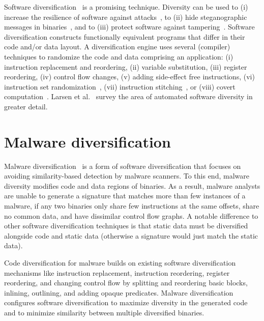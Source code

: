 \documentclass[letterpaper,twocolumn,10pt]{article}
\begin{document}
Software diversification~\cite{cohen93csec, collberg97, forrest97hotos,
cox06usenix, kisserli07cobassa, Lin09DIMVA, franz10npsw, multicompiler, Hiser12SP,
Pappas12SP, Giuffrida12SEC} is a promising technique. Diversity can be
used to (i) increase the resilience of software against
attacks~\cite{cohen93csec, forrest97hotos, geer03cciar, cox06usenix,
kisserli07cobassa, Lin09DIMVA, franz10npsw, multicompiler, Hiser12SP, Pappas12SP,
Giuffrida12SEC}, to (ii) hide steganographic messages in
binaries~\cite{elkhalil04icics}, and to (iii) protect software against
tampering~\cite{collberg12acsac}. Software diversification constructs
functionally equivalent programs that differ in their code and/or data layout. A
diversification engine uses several (compiler) techniques to randomize the code and
data comprising an application: (i) instruction replacement and reordering, (ii)
variable substitution, (iii) register reordering, (iv) control flow changes, (v)
adding side-effect free instructions, (vi) instruction set
randomization~\cite{barrantes05tiss, kc03ccs, sovarel05ssym, williams09sp},
(vii) instruction stitching~\cite{DBLP:conf/woot/MohanH12}, or (viii) covert
computation~\cite{schrittwieser13ccs}. Larsen et al.~\cite{larsen.etal+14} 
survey the area of automated software diversity in greater detail. %


\section{Malware diversification}

Malware diversification~\cite{payer14syscan} is a form of software
diversification that focuses on avoiding similarity-based detection by malware
scanners. To this end, malware diversity modifies code and data regions of
binaries. As a result, malware analysts are unable to generate a signature that
matches more than few instances of a malware, if any two binaries only share few
instructions at the same offsets, share no common data, and have dissimilar
control flow graphs. A notable difference to other software diversification
techniques is that static data must be diversified alongside code and static
data (otherwise a signature would just match the static data).

Code diversification for malware builds on existing software diversification
mechanisms like instruction replacement, instruction reordering, register
reordering, and changing control flow by splitting and reordering basic blocks,
inlining, outlining, and adding opaque predicates. Malware diversification
configures software diversification to maximize diversity in the generated code
and to minimize similarity between multiple diversified binaries.
\end{document}
